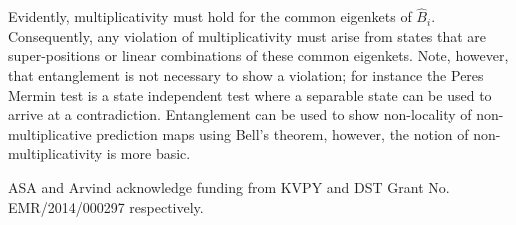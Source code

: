 \documentclass[british,aps,prl,superscriptaddress,nofootinbib,times,reprint]{revtex4-1}
\theoremstyle{plain}
\theoremstyle{plain}
\theoremstyle{definition}
\theoremstyle{remark}
\theoremstyle{remark}
\theoremstyle{remark}
\theoremstyle{plain}
\theoremstyle{plain}
\theoremstyle{plain}
\theoremstyle{definition}
\theoremstyle{definition}
\begin{document}
Evidently, multiplicativity must hold for the
common eigenkets of $\hat{B}_{i}$.  Consequently,
any violation of multiplicativity must arise from
states that are super-positions or linear
combinations of these common eigenkets.  Note,
however, that entanglement is not necessary to
show a violation; for instance the Peres Mermin
test is a state independent test where a separable
state can be used to arrive at a contradiction.
Entanglement can be used to show non-locality of
non-multiplicative prediction maps using Bell's
theorem, however, the notion of non-multiplicativity
is more basic.  \begin{acknowledgments} 
ASA and Arvind acknowledge funding from KVPY and DST Grant No. EMR/2014/000297 respectively.
\end{acknowledgments}
%
 
\end{document}
